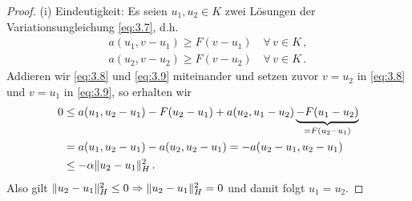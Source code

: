 \begin{proof}
(i) Eindeutigkeit: Es seien $u_1,u_2 \in K$ zwei Lösungen der Variationsungleichung \eqref{eq:3.7}, d.h.
\begin{align}\label{eq:3.8}
	a(u_1,v-u_1) \ge F(v-u_1) \quad \forall \, v \in K\, , \\
	a(u_2,v-u_2) \ge F(v-u_2) \quad \forall \, v \in K\, . \label{eq:3.9}
\end{align}
Addieren wir \eqref{eq:3.8} und \eqref{eq:3.9} miteinander und setzen zuvor $v = u_2$ in \eqref{eq:3.8} und $v = u_1$ in \eqref{eq:3.9}, so erhalten wir
\begin{align*}
	0 & \le a(u_1,u_2-u_1) - F(u_2-u_1) + a(u_2,u_1-u_2) \underbrace{- F(u_1-u_2)}_{=F(u_2-u_1)}  \\
	& = a(u_1,u_2-u_1)-a(u_2,u_2-u_1) = -a(u_2-u_1,u_2-u_1) \\
	& \le -\alpha \lVert u_2-u_1\rVert_H^2 \, .
\end{align*}
Also gilt $\lVert u_2-u_1\rVert_H^2 \le 0 \Rightarrow \lVert u_2-u_1\rVert_H^2 = 0$ und damit folgt $u_1 = u_2$.


\end{proof}
